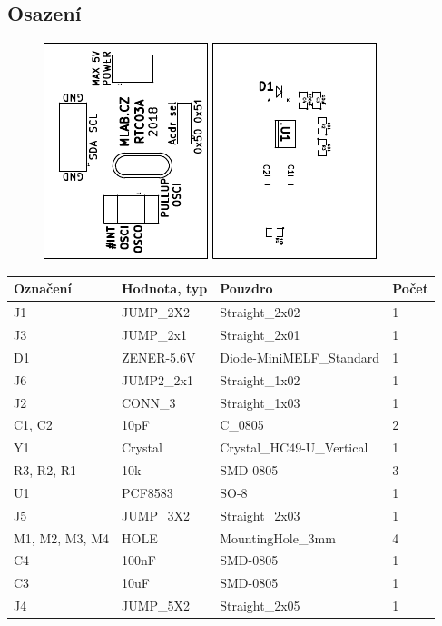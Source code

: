 \subsection{Osazení}


\begin{figure}[ht!]
	\centering
	\includegraphics[scale=2]{../../doc/src/RTC03A-top_cropped.pdf}
	\qquad
	\includegraphics[scale=2]{../../doc/src/RTC03A-bottom_cropped.pdf}
\end{figure}

\begin{center}
  \begin{tabular}{ | l | l | l | l |}
    \hline
    Označení & Hodnota, typ & Pouzdro & Počet \\ \hline
    \hline
			J1 & JUMP\_2X2 & Straight\_2x02 & 1\\ \hline
			J3 & JUMP\_2x1 & Straight\_2x01 & 1\\ \hline
			D1 & ZENER-5.6V & Diode-MiniMELF\_Standard & 1\\ \hline
			J6 & JUMP2\_2x1 & Straight\_1x02 & 1\\ \hline
			J2 & CONN\_3 & Straight\_1x03 & 1\\ \hline
			C1, C2 & 10pF & C\_0805 & 2\\ \hline
			Y1 & Crystal & Crystal\_HC49-U\_Vertical & 1\\ \hline
			R3, R2, R1 & 10k & SMD-0805 & 3\\ \hline
			U1 & PCF8583 & SO-8 & 1\\ \hline
			J5 & JUMP\_3X2 & Straight\_2x03 & 1\\ \hline
			M1, M2, M3, M4 & HOLE & MountingHole\_3mm & 4\\ \hline
			C4 & 100nF & SMD-0805 & 1\\ \hline
			C3 & 10uF & SMD-0805 & 1\\ \hline
			J4 & JUMP\_5X2 & Straight\_2x05 & 1\\ \hline
	
  \end{tabular}
\end{center}
